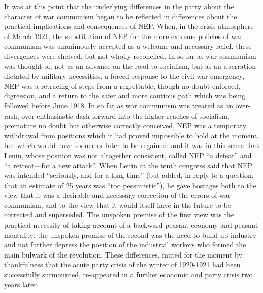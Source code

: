 It was at this point that the underlying differences in the party about the character of war communism began to be reflected in differences about the practical implications and consequences of NEP. When, in the crisis atmosphere of March 1921, the substitution of NEP for the more extreme policies of war communism was unanimously accepted as a welcome and necessary relief, these divergences were shelved, but not wholly reconciled. In so far as war communism was thought of, not as an advance on the road to socialism, but as an aberration dictated by military necessities, a forced response to the civil war emergency, NEP was a retracing of steps from a regrettable, though no doubt enforced, digression, and a return to the safer and more cautious path which was being followed before June 1918. In so far as war communism was treated as an over-rash, over-enthusiastic dash forward into the higher reaches of socialism, premature no doubt but otherwise correctly conceived, NEP was a temporary withdrawal from positions which it had proved impossible to hold at the moment, but which would have sooner or later to be regained; and it was in this sense that Lenin, whose position was not altogether consistent, called NEP ``a defeat'' and ``a retreat---for a new attack''. When Lenin at the tenth congress said that NEP was intended ``seriously, and for a long time'' (but added, in reply to a question, that an estimate of 25 years was ``too pessimistic''), he gave hostages both to the view that it was a desirable and necessary correction of the errors of war communism, and to the view that it would itself have in the future to be corrected and superseded. The unspoken premise of the first view was the practical necessity of taking account of a backward peasant economy and peasant mentality; the unspoken premise of the second was the need to build up industry and not further depress the position of the industrial workers who formed the main bulwark of the revolution. These differences, muted for the moment by thankfulness that the acute party crisis of the winter of 1920-1921 had been successfully surmounted, re-appeared in a further economic and party crisis two years later. 
